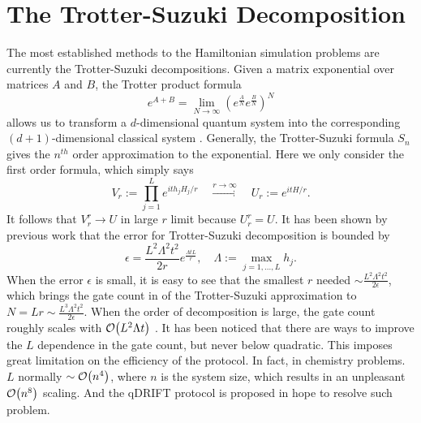 \documentclass[letterpaper, 11pt]{article}
\begin{document}
\section*{The Trotter-Suzuki Decomposition}
The most established methods to the Hamiltonian simulation problems are currently the Trotter-Suzuki decompositions. Given a matrix exponential over matrices $A$ and $B$, the Trotter product formula
\begin{equation}
    e^{A + B} = \lim_{N \rightarrow \infty} (e^{\frac{A}{N}} e^{\frac{B}{N}})^N
\end{equation}
allows us to transform a $d$-dimensional quantum system into the corresponding $(d + 1)$-dimensional classical system \cite{SUZUKI1993432}. Generally, the Trotter-Suzuki formula $S_n$ gives the $n^{th}$ order approximation to the exponential. Here we only consider the first order formula, which simply says 
\begin{equation}
    V_r := \prod_{j = 1}^{L} e^{it h_j H_j/r} \quad \xrightarrow{ r \rightarrow \infty} \quad U_r := e^{itH/r}.
\end{equation}
It follows that $V_r^r \rightarrow U$ in large $r$ limit because $U_r^r = U$. It has been shown by previous work \cite{Childs9456} that the error for Trotter-Suzuki decomposition is bounded by
\begin{equation}
    \epsilon = \frac{L^2 \Lambda^2 t^2}{2r} e^{\frac{\Lambda t L}{r}}, \quad \Lambda := \max_{j = 1, ..., L}{h_j}.
\end{equation}
When the error $\epsilon$ is small, it is easy to see that the smallest $r$ needed $\sim \frac{L^2 \Lambda^2 t^2}{2 \epsilon}$, which brings the gate count in of the Trotter-Suzuki approximation to $N = Lr \sim \frac{L^3 \Lambda^2 t^2}{2 \epsilon}$. %
When the order of decomposition is large, the gate count roughly scales with $\order{L^2 \Lambda t}$ \cite{PhysRevLett.123.070503}. It has been noticed that there are ways to improve the $L$ dependence in the gate count\cite{Childs9456}, but never below quadratic. This imposes great limitation on the efficiency of the protocol. In fact, in chemistry problems. $L$ normally $\sim \order{n^4}$, where $n$ is the system size, which results in an unpleasant $\order{n^8}$ scaling. And the qDRIFT protocol is proposed in hope to resolve such problem.



\end{document}
